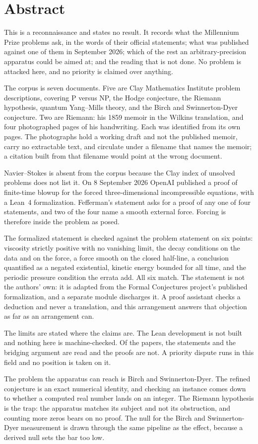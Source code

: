 \chapter*{Abstract}

This is a reconnaissance and states no result. It records what the Millennium Prize problems ask, in
the words of their official statements; what was published against one of them in September 2026;
which of the rest an arbitrary-precision apparatus could be aimed at; and the reading that is not
done. No problem is attacked here, and no priority is claimed over anything.

The corpus is seven documents. Five are Clay Mathematics Institute problem descriptions, covering P
versus NP, the Hodge conjecture, the Riemann hypothesis, quantum Yang--Mills theory, and the Birch
and Swinnerton-Dyer conjecture. Two are Riemann: his 1859 memoir in the Wilkins translation, and four
photographed pages of his handwriting. Each was identified from its own pages. The photographs hold a
working draft and not the published memoir, carry no extractable text, and circulate under a
filename that names the memoir; a citation built from that filename would point at the wrong
document.

Navier--Stokes is absent from the corpus because the Clay index of unsolved problems does not list
it. On 8 September 2026 OpenAI published a proof of finite-time blowup for the forced
three-dimensional incompressible equations, with a Lean~4 formalization. Fefferman's statement asks
for a proof of any one of four statements, and two of the four name a smooth external force. Forcing
is therefore inside the problem as posed.

The formalized statement is checked against the problem statement on six points: viscosity strictly
positive with no vanishing limit, the decay conditions on the data and on the force, a force smooth
on the closed half-line, a conclusion quantified as a negated existential, kinetic energy bounded for
all time, and the periodic pressure condition the errata add. All six match. The statement is not
the authors' own: it is adapted from the Formal Conjectures project's published formalization, and a
separate module discharges it. A proof assistant checks a deduction and never a translation, and
this arrangement answers that objection as far as an arrangement can.

The limits are stated where the claims are. The Lean development is not built and nothing here is
machine-checked. Of the papers, the statements and the bridging argument are read and the proofs are
not. A priority dispute runs in this field and no position is taken on it.

The problem the apparatus can reach is Birch and Swinnerton-Dyer. The refined conjecture is an exact
numerical identity, and checking an instance comes down to whether a computed real number lands on an
integer. The Riemann hypothesis is the trap: the apparatus matches its subject and not its
obstruction, and counting more zeros bears on no proof. The null for the Birch and Swinnerton-Dyer
measurement is drawn through the same pipeline as the effect, because a derived null sets the bar too
low.
\cleardoublepage
